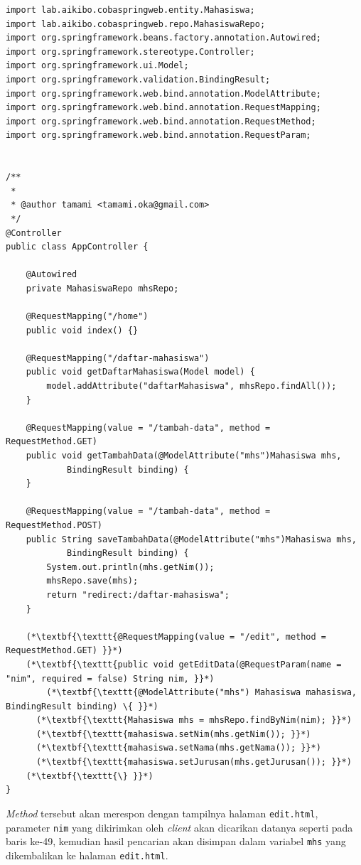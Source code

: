 \begin{enumerate}
\begin{lstlisting}
import lab.aikibo.cobaspringweb.entity.Mahasiswa;
import lab.aikibo.cobaspringweb.repo.MahasiswaRepo;
import org.springframework.beans.factory.annotation.Autowired;
import org.springframework.stereotype.Controller;
import org.springframework.ui.Model;
import org.springframework.validation.BindingResult;
import org.springframework.web.bind.annotation.ModelAttribute;
import org.springframework.web.bind.annotation.RequestMapping;
import org.springframework.web.bind.annotation.RequestMethod;
import org.springframework.web.bind.annotation.RequestParam;


/**
 *
 * @author tamami <tamami.oka@gmail.com>
 */
@Controller
public class AppController {
    
    @Autowired
    private MahasiswaRepo mhsRepo;
    
    @RequestMapping("/home")
    public void index() {}
    
    @RequestMapping("/daftar-mahasiswa") 
    public void getDaftarMahasiswa(Model model) {
        model.addAttribute("daftarMahasiswa", mhsRepo.findAll());
    }
    
    @RequestMapping(value = "/tambah-data", method = RequestMethod.GET)
    public void getTambahData(@ModelAttribute("mhs")Mahasiswa mhs, 
            BindingResult binding) {
    }
    
    @RequestMapping(value = "/tambah-data", method = RequestMethod.POST) 
    public String saveTambahData(@ModelAttribute("mhs")Mahasiswa mhs,
            BindingResult binding) {
        System.out.println(mhs.getNim());
        mhsRepo.save(mhs);
        return "redirect:/daftar-mahasiswa";
    }

    (*\textbf{\texttt{@RequestMapping(value = "/edit", method = RequestMethod.GET) }}*)
    (*\textbf{\texttt{public void getEditData(@RequestParam(name = "nim", required = false) String nim, }}*)
        (*\textbf{\texttt{@ModelAttribute("mhs") Mahasiswa mahasiswa, BindingResult binding) \{ }}*)
      (*\textbf{\texttt{Mahasiswa mhs = mhsRepo.findByNim(nim); }}*)
      (*\textbf{\texttt{mahasiswa.setNim(mhs.getNim()); }}*)
      (*\textbf{\texttt{mahasiswa.setNama(mhs.getNama()); }}*)
      (*\textbf{\texttt{mahasiswa.setJurusan(mhs.getJurusan()); }}*)
    (*\textbf{\texttt{\} }}*)
}
	\end{lstlisting}

	\textit{Method} tersebut akan merespon dengan tampilnya halaman \texttt{edit.html}, parameter \texttt{nim} yang dikirimkan oleh \textit{client} akan dicarikan datanya seperti pada baris ke-49, kemudian hasil pencarian akan disimpan dalam variabel \texttt{mhs} yang dikembalikan ke halaman \texttt{edit.html}.
	

\end{enumerate}
